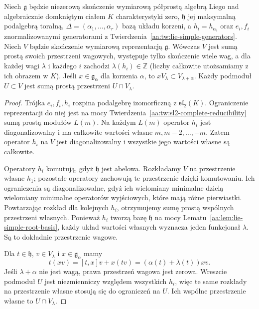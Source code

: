 \begin{twierdzenie}
\label{aa:tw:lie-weight-decomposition}
Niech $\mathfrak g$ będzie niezerową skończenie wymiarową półprostą algebrą Liego nad algebraicznie domkniętym ciałem $K$ charakterystyki zero, $\mathfrak h$ jej maksymalną podalgebrą toralną, $\Delta=(\alpha_1,\ldots,\alpha_r)$ bazą układu korzeni, a $h_i=h_{\alpha_i}$ oraz $e_i,f_i$ znormalizowanymi generatorami z Twierdzenia~\ref{aa:tw:lie-simple-generators}. Niech $V$ będzie skończenie wymiarową reprezentacją $\mathfrak g$. Wówczas $V$ jest sumą prostą swoich przestrzeni wagowych, występuje tylko skończenie wiele wag, a dla każdej wagi $\lambda$ i każdego $i$ zachodzi $\lambda(h_i)\in\mathbb Z$ (liczby całkowite utożsamiamy z ich obrazem w $K$). Jeśli $x\in\mathfrak g_\alpha$ dla korzenia $\alpha$, to $xV_\lambda\subset V_{\lambda+\alpha}$. Każdy podmoduł $U\subset V$ jest sumą prostą przestrzeni $U\cap V_\lambda$.
\end{twierdzenie}
\begin{proof}
Trójka $e_i,f_i,h_i$ rozpina podalgebrę izomorficzną z $\mathfrak{sl}_2(K)$. Ograniczenie reprezentacji do niej jest na mocy Twierdzenia~\ref{aa:tw:sl2-complete-reducibility} sumą prostą modułów $L(m)$. Na każdym $L(m)$ operator $h_i$ jest diagonalizowalny i ma całkowite wartości własne $m,m-2,\ldots,-m$. Zatem operator $h_i$ na $V$ jest diagonalizowalny i wszystkie jego wartości własne są całkowite.

Operatory $h_i$ komutują, gdyż $\mathfrak h$ jest abelowa. Rozkładamy $V$ na przestrzenie własne $h_1$; pozostałe operatory zachowują te przestrzenie dzięki komutowaniu. Ich ograniczenia są diagonalizowalne, gdyż ich wielomiany minimalne dzielą wielomiany minimalne operatorów wyjściowych, które mają różne pierwiastki. Powtarzając rozkład dla kolejnych $h_i$, otrzymujemy sumę prostą wspólnych przestrzeni własnych. Ponieważ $h_i$ tworzą bazę $\mathfrak h$ na mocy Lematu~\ref{aa:lem:lie-simple-root-basis}, każdy układ wartości własnych wyznacza jeden funkcjonał $\lambda$. Są to dokładnie przestrzenie wagowe.

Dla $t\in\mathfrak h$, $v\in V_\lambda$ i $x\in\mathfrak g_\alpha$ mamy
\[
 t(xv)=[t,x]v+x(tv)=(\alpha(t)+\lambda(t))xv.
\]
Jeśli $\lambda+\alpha$ nie jest wagą, prawa przestrzeń wagowa jest zerowa. Wreszcie podmoduł $U$ jest niezmienniczy względem wszystkich $h_i$, więc te same rozkłady na przestrzenie własne stosują się do ograniczeń na $U$. Ich wspólne przestrzenie własne to $U\cap V_\lambda$.
\end{proof}

